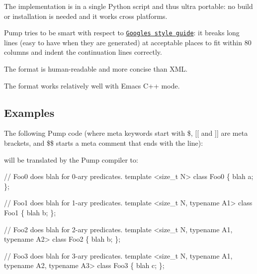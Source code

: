 \begin{DoxyItemize}
\item The implementation is in a single Python script and thus ultra portable\+: no build or installation is needed and it works cross platforms.
\item Pump tries to be smart with respect to \href{https://github.com/google/styleguide}{\tt Google\textquotesingle{}s style guide}\+: it breaks long lines (easy to have when they are generated) at acceptable places to fit within 80 columns and indent the continuation lines correctly.
\item The format is human-\/readable and more concise than X\+ML.
\item The format works relatively well with Emacs\textquotesingle{} C++ mode.
\end{DoxyItemize}

\subsection*{Examples}

The following Pump code (where meta keywords start with {\ttfamily \$}, {\ttfamily \mbox{[}\mbox{[}} and {\ttfamily \mbox{]}\mbox{]}} are meta brackets, and {\ttfamily \$\$} starts a meta comment that ends with the line)\+:




will be translated by the Pump compiler to\+:


\begin{DoxyCode}
// Foo0 does blah for 0-ary predicates.
template <size\_t N>
class Foo0 \{
  blah a;
\};

// Foo1 does blah for 1-ary predicates.
template <size\_t N, typename A1>
class Foo1 \{
  blah b;
\};

// Foo2 does blah for 2-ary predicates.
template <size\_t N, typename A1, typename A2>
class Foo2 \{
  blah b;
\};

// Foo3 does blah for 3-ary predicates.
template <size\_t N, typename A1, typename A2, typename A3>
class Foo3 \{
  blah c;
\};
\end{DoxyCode}


